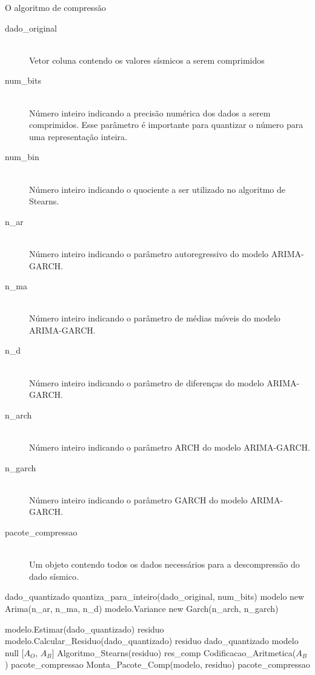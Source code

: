  \begin{algorithm}
\caption{O algoritmo de compressão}
\label{Algoritmo:SAGE}
\Entrada
{
\begin{description}
  \item[dado\_original]\\
  	Vetor coluna contendo os valores sísmicos a serem comprimidos
  \item[num\_bits]\\
  	Número inteiro indicando a precisão numérica dos dados a serem comprimidos.
  	Esse parâmetro é importante para quantizar o número para uma representação inteira.
  \item[num\_bin]\\
  	Número inteiro indicando o quociente a ser utilizado no algoritmo de Stearns.
  \item[n\_ar]\\
  	Número inteiro indicando o parâmetro autoregressivo do modelo ARIMA-GARCH.
  \item[n\_ma]\\
  	Número inteiro indicando o parâmetro de médias móveis do modelo ARIMA-GARCH.
  \item[n\_d]\\
  	Número inteiro indicando o parâmetro de diferenças do modelo ARIMA-GARCH.
  \item[n\_arch]\\
  	Número inteiro indicando o parâmetro ARCH do modelo ARIMA-GARCH.
  \item[n\_garch]\\
  	Número inteiro indicando o parâmetro GARCH do modelo ARIMA-GARCH.
\end{description}
}
\Saida
{
\begin{description}
  \item[pacote\_compressao]\\
  	Um objeto contendo todos os dados necessários para a descompressão do dado
  	sísmico.
\end{description}
}
\Inicio
{

dado\_quantizado \rec quantiza\_para\_inteiro(dado\_original,
num\_bits) \; modelo \rec new Arima(n\_ar, n\_ma, n\_d)\;
{
modelo.Variance \rec new Garch(n\_arch, n\_garch)\;
}

modelo.Estimar(dado\_quantizado)\;
{
	residuo \rec modelo.Calcular\_Residuo(dado\_quantizado)\;
}
{
	residuo \rec dado\_quantizado\;
	modelo \rec null\;
}
[$A_O$, $A_B$] \rec Algoritmo\_Stearns(residuo) \;
res\_comp \rec Codificacao\_Aritmetica($A_B$)\;
pacote\_compressao \rec Monta\_Pacote\_Comp(modelo, residuo)\;
\Retorna pacote\_compressao\;
}
\end{algorithm}


